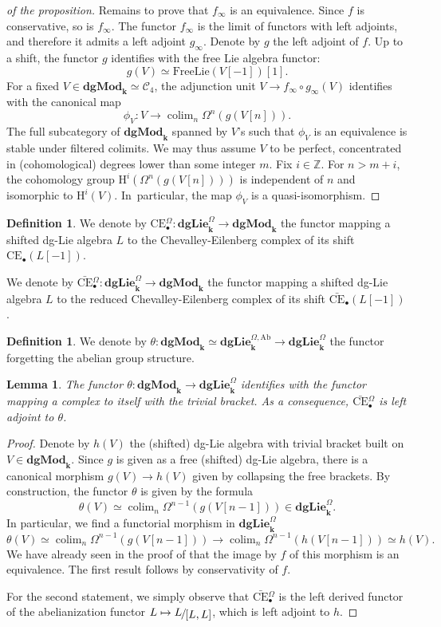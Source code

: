 \documentclass[JEP,XML,SOM,Unicode,NoEqCountersInSection]{cedram}
\let\mathcal\mathscr
\let\autoref\Cref
\newcommand\mto{\mathchoice{\longmapsto}{\mapsto}{\mapsto}{\mapsto}}
\let\widebar\bar
\newcommand{\sbullet}{{\scriptscriptstyle\bullet}}
\newtheorem{lem}[thm]{Lemma}
\theoremstyle{definition}
\newtheorem{df}[thm]{Definition}
\newcommand{\Z}{\mathbb{Z}}
\newcommand{\Cc}{\mathcal{C}}
\newcommand{\dgLie}{\mathbf{dgLie}}
\newcommand{\dgMod}{\mathbf{dgMod}}
\DeclareMathOperator{\colim}{colim}
\newcommand{\homol}{\mathrm H}
\newcommand{\quot}[2]{\ensuremath \mathchoice {\displaystyle #1 \raisebox{-2pt}{$\displaystyle \hspace{-1pt}{\big/} $} \raisebox{-4pt}{$\displaystyle \hspace{-1pt}{#2}$}}{\textstyle #1 \raisebox{-1pt}{$\textstyle \hspace{-1pt}{/} $} \raisebox{-2pt}{$\textstyle \hspace{-1pt}{#2}$}}{\scriptstyle #1 \raisebox{-1pt}{$\scriptstyle \hspace{-1pt}{/} $} \raisebox{-2pt}{$\scriptstyle \hspace{-1pt}{#2}$}}{\scriptscriptstyle #1 \raisebox{-1pt}{$\scriptscriptstyle \hspace{-1pt}{/} $} \raisebox{-2pt}{$\scriptscriptstyle \hspace{-1pt}{#2}$}}}
\renewcommand{\k}{{\boldsymbol{k}}}
\newcommand{\bCE}{\widebar{\mathrm{CE}}}
\newcommand{\bCEO}{\widebar{\mathrm{CE}}{}^\Omega_\sbullet}
\newcommand{\CE}{\mathrm{CE}}
\newcommand{\CEO}{\mathrm{CE}{}^\Omega_\sbullet}
\begin{document}
\begin{proof}[of the proposition]
Remains to prove that $f_\infty$ is an equivalence. Since $f$ is conservative, so is $f_\infty$. The functor $f_\infty$ is the limit of functors with left adjoints, and therefore it admits a left adjoint $g_\infty$. Denote by $g$ the left adjoint of $f$. Up to a shift, the functor $g$ identifies with the free Lie algebra functor:
\[
g(V) \simeq \mathrm{FreeLie}(V[-1]) [1].
\]
For a fixed $V \in \dgMod_\k \simeq \Cc_4$, the adjunction unit $V \to f_\infty \circ g_\infty(V)$ identifies with the canonical map
\[
\phi_V \colon V \to \colim_n \Omega^{n}(g(V[n])).
\]
The full subcategory of $\dgMod_\k$ spanned by $V$'s such that $\phi_V$ is an equivalence is stable under filtered colimits. We may thus assume $V$ to be perfect, concentrated in (cohomological) degrees lower than some integer $m$.
Fix $i \in \Z$. For $n > m + i$, the cohomology group $\homol^i(\Omega^{n}(g(V[n])))$ is independent of $n$ and isomorphic to $\homol^i(V)$. In~particular, the map $\phi_V$ is a quasi-isomorphism.
\end{proof}

\begin{df}
We denote by $\CEO \colon \dgLie_\k^\Omega \to \dgMod_\k$ the functor mapping a shifted dg-Lie algebra $L$ to the Chevalley-Eilenberg complex of its shift $\CE_\sbullet(L[-1])$.

We denote by $\bCEO \colon \dgLie_\k^\Omega \to \dgMod_\k$ the functor mapping a shifted dg-Lie algebra $L$ to the reduced Chevalley-Eilenberg complex of its shift $\bCE_\sbullet(L[-1])$.
\end{df}
\begin{df}
We denote by $\theta \colon \dgMod_\k \simeq \dgLie_\k^{\Omega,\mathrm{Ab}} \to \dgLie_\k^{\Omega}$ the functor forgetting the abelian group structure.
\end{df}

\begin{lem}
The functor $\theta \colon \dgMod_\k \to \dgLie_\k^\Omega$ identifies with the functor mapping a complex to itself with the trivial bracket.
As a consequence, $\bCEO$ is left adjoint to $\theta$.
\end{lem}
\begin{proof}
Denote by $h(V)$ the (shifted) dg-Lie algebra with trivial bracket built on $V \in \dgMod_\k$.
Since $g$ is given as a free (shifted) dg-Lie algebra, there is a canonical morphism $g(V) \to h(V)$ given by collapsing the free brackets.
By construction, the functor $\theta$ is given by the formula
\[
\theta(V) \simeq \colim_n \Omega^{n-1}(g(V[n-1])) \in \dgLie_\k^\Omega.
\]
In particular, we find a functorial morphism in $\dgLie_\k^\Omega$
\[
\theta(V) \simeq \colim_n \Omega^{n-1}(g(V[n-1])) \to \colim_n \Omega^{n-1}(h(V[n-1])) \simeq h(V).
\]
We have already seen in the proof of \autoref{prop:abelianlie} that the image by $f$ of this morphism is an equivalence. The first result follows by conservativity of $f$.

For the second statement, we simply observe that $\bCEO$ is the left derived functor of the abelianization functor $L \mto \quot{L}{[L,L]}$, which is left adjoint to $h$.
\end{proof}
\end{document}
